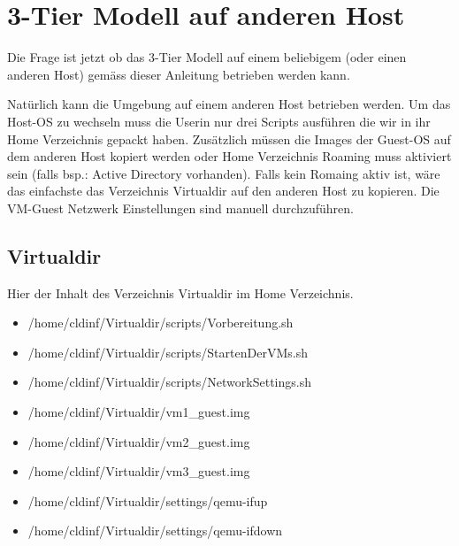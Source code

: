 \documentclass[a4,12pt]{scrartcl}
\begin{document}
\section{3-Tier Modell auf anderen Host}
Die Frage ist jetzt ob das 3-Tier Modell auf einem beliebigem (oder einen anderen Host) gemäss dieser Anleitung betrieben werden kann. 

\noindent Natürlich kann die Umgebung auf einem anderen Host betrieben werden. Um das Host-OS zu wechseln muss die Userin nur drei Scripts ausführen die wir in ihr Home Verzeichnis gepackt haben. Zusätzlich müssen die Images der Guest-OS auf dem anderen Host kopiert werden oder Home Verzeichnis Roaming muss aktiviert sein (falls bsp.: Active Directory vorhanden). Falls kein Romaing aktiv ist, wäre das einfachste das Verzeichnis Virtualdir auf den anderen Host zu kopieren. Die VM-Guest Netzwerk Einstellungen sind manuell durchzuführen. 

\subsection{Virtualdir}
Hier der Inhalt des Verzeichnis Virtualdir im Home Verzeichnis. 
\begin{itemize}
\item /home/cldinf/Virtualdir/scripts/Vorbereitung.sh
\item /home/cldinf/Virtualdir/scripts/StartenDerVMs.sh 
\item /home/cldinf/Virtualdir/scripts/NetworkSettings.sh
\item /home/cldinf/Virtualdir/vm1\_guest.img
\item /home/cldinf/Virtualdir/vm2\_guest.img
\item /home/cldinf/Virtualdir/vm3\_guest.img 
\item /home/cldinf/Virtualdir/settings/qemu-ifup
\item /home/cldinf/Virtualdir/settings/qemu-ifdown
\end{itemize}
\end{document}
